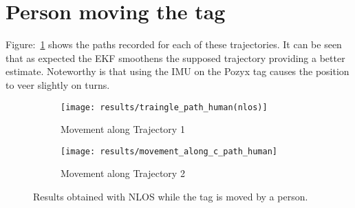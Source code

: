 \section{Person moving the tag}\label{sec:person-moving-the-tag}
Figure:~\ref{fig:nlos_ppl} shows the paths recorded for each of these trajectories.
It can be seen that as expected the EKF smoothens the supposed trajectory providing a better estimate.
Noteworthy is that using the IMU on the Pozyx tag causes the position to veer slightly on turns.
\begin{figure}[ht!]
    \centering
    \begin{subfigure}{0.7\textwidth}
            \texttt{[image: results/traingle\_path\_human(nlos)]}
            \caption{Movement along Trajectory 1}
    \end{subfigure}
    \begin{subfigure}{0.7\textwidth}
            \texttt{[image: results/movement\_along\_c\_path\_human]}
            \caption{Movement along Trajectory 2}
    \end{subfigure}
    \caption{Results obtained with NLOS while the tag is moved by a person.}
    \label{fig:nlos_ppl}
\end{figure}
\newpage
